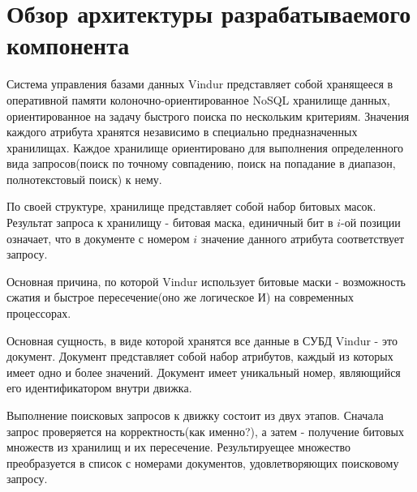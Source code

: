 \documentclass{matmex-diploma}
\begin{document}
\section{Обзор архитектуры разрабатываемого компонента}
    Система управления базами данных Vindur представляет собой хранящееся в оперативной памяти колоночно-ориентированное NoSQL хранилище данных, ориентированное на задачу быстрого поиска по нескольким критериям. Значения каждого атрибута хранятся независимо в специально предназначенных хранилищах. Каждое хранилище ориентировано для выполнения определенного вида запросов(поиск по точному совпадению, поиск на попадание в диапазон, полнотекстовый поиск) к нему.
    
    По своей структуре, хранилище представляет собой набор битовых масок. Результат запроса к хранилищу - битовая маска, единичный бит в $i$-ой позиции означает, что в документе с номером $i$ значение данного атрибута соответствует запросу.
    
    Основная причина, по которой Vindur использует битовые маски - возможность сжатия и быстрое пересечение(оно же логическое И) на современных процессорах. %
    
    Основная сущность, в виде которой хранятся все данные в СУБД Vindur - это документ. Документ представляет собой набор атрибутов, каждый из которых имеет одно и более значений. Документ имеет уникальный номер, являющийся его идентификатором внутри движка.
    
    Выполнение поисковых запросов к движку состоит из двух этапов. Сначала запрос проверяется на корректность(как именно?), а затем - получение битовых множеств из хранилищ и их пересечение. Результируещее множество преобразуется в список с номерами документов, удовлетворяющих поисковому запросу. %
\end{document}
